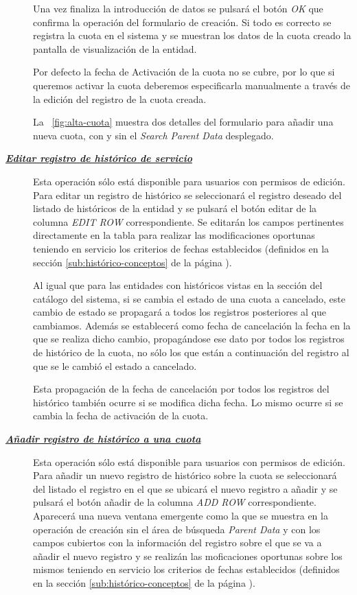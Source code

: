 \begin{description}
Una vez finaliza la introducción de datos se pulsará el botón \emph{OK} que confirma la operación del formulario de creación. Si todo es correcto se registra la cuota en el sistema y se muestran los datos de la cuota creado la pantalla de visualización de la entidad.

Por defecto la fecha de Activación de la cuota no se cubre, por lo que si queremos activar la cuota deberemos especificarla manualmente a través de la edición del registro de la cuota creada.

La \figurename~\ref{fig:alta-cuota} muestra dos detalles del formulario para añadir una nueva cuota, con y sin el \emph{Search Parent Data} desplegado.

\item[\underline{\textsl{\textbf{Editar registro de histórico de servicio}}}] Esta operación sólo está disponible para usuarios con permisos de edición.
Para editar un registro de histórico se seleccionará el registro deseado del listado de históricos de la entidad y se pulsará el botón editar de la columna \textit{EDIT ROW} correspondiente. Se editarán los campos pertinentes directamente en la tabla para realizar las modificaciones oportunas teniendo en servicio los criterios de fechas establecidos (definidos en la sección \ref{sub:histórico-conceptos} de la página \pageref{sub:histórico-conceptos}).

Al igual que para las entidades con históricos vistas en la sección del catálogo del sistema, si se cambia el estado de una cuota a cancelado, este cambio de estado se propagará a todos los registros posteriores al que cambiamos. Además se establecerá como fecha de cancelación la fecha en la que se realiza dicho cambio, propagándose ese dato por todos los registros de histórico de la cuota, no sólo los que están a continuación del registro al que se le cambió el estado a cancelado.

Esta propagación de la fecha de cancelación por todos los registros del histórico  también ocurre si se modifica dicha fecha. Lo mismo ocurre si se cambia la fecha de activación de la cuota.

\item[\underline{\textsl{\textbf{Añadir registro de histórico a una cuota}}}] Esta operación sólo está disponible para usuarios con permisos de edición.
Para añadir un nuevo registro de histórico sobre la cuota se seleccionará del listado el registro en el que se ubicará el nuevo registro a añadir y se pulsará el botón añadir de la columna \textit{ADD ROW} correspondiente. Aparecerá una nueva ventana emergente como la que se muestra en la operación de creación sin el área de búsqueda \emph{Parent Data} y con los campos cubiertos con la información del registro sobre el que se va a añadir el nuevo registro y se realizán las moficaciones oportunas sobre los mismos teniendo en servicio los criterios de fechas establecidos (definidos en la sección \ref{sub:histórico-conceptos} de la página \pageref{sub:histórico-conceptos}).


\end{description}
